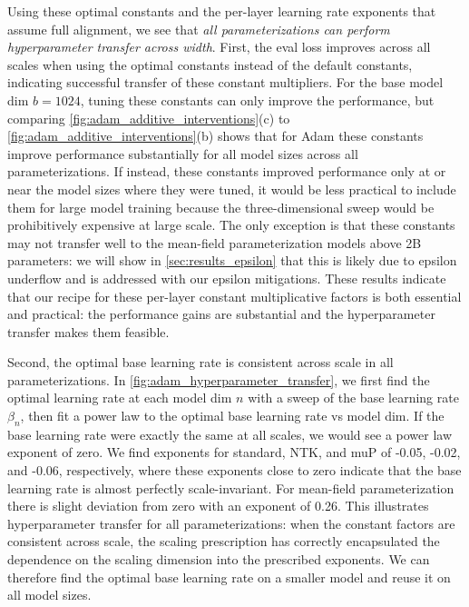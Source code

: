 \documentclass{article}
\theoremstyle{plain}
\theoremstyle{definition}
\theoremstyle{remark}
\begin{document}
Using these optimal constants and the per-layer learning rate exponents that assume full alignment, we see that \emph{all parameterizations can perform hyperparameter transfer across width}. First, the eval loss improves across all scales when using the optimal constants instead of the default constants, indicating successful transfer of these constant multipliers. For the base model dim $b=1024$, tuning these constants can only improve the performance, but comparing \cref{fig:adam_additive_interventions}(c) to \ref{fig:adam_additive_interventions}(b) shows that for Adam these constants improve performance substantially for all model sizes across all parameterizations. If instead, these constants improved performance only at or near the model sizes where they were tuned, it would be less practical to include them for large model training because the three-dimensional sweep would be prohibitively expensive at large scale. The only exception is that these constants may not transfer well to the mean-field parameterization models above 2B parameters: we will show in \cref{sec:results_epsilon} that this is likely due to epsilon underflow and is addressed with our epsilon mitigations. These results indicate that our recipe for these per-layer constant multiplicative factors is both essential and practical: the performance gains are substantial and the hyperparameter transfer makes them feasible.

Second, the optimal base learning rate is consistent across scale in all parameterizations. In \cref{fig:adam_hyperparameter_transfer}, we first find the optimal learning rate at each model dim $n$ with a sweep of the base learning rate $\beta_n$, then fit a power law to the optimal base learning rate vs model dim. If the base learning rate were exactly the same at all scales, we would see a power law exponent of zero. We find exponents for standard, NTK, and muP of -0.05, -0.02, and -0.06, respectively, where these exponents close to zero indicate that the base learning rate is almost perfectly scale-invariant. For mean-field parameterization there is slight deviation from zero with an exponent of 0.26. This illustrates hyperparameter transfer for all parameterizations: when the constant factors are consistent across scale, the scaling prescription has correctly encapsulated the dependence on the scaling dimension into the prescribed exponents. We can therefore find the optimal base learning rate on a smaller model and reuse it on all model sizes.
\end{document}
